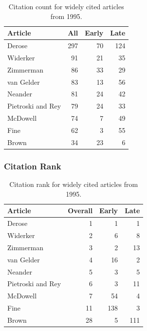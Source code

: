 \documentclass[
  10pt,
  letterpaper,
  DIV=11,
  numbers=noendperiod,
  twoside]{scrartcl}
\begin{document}
\begin{longtable}[]{@{}lrrr@{}}

\caption{\label{tbl-citation-count-1995}Citation count for widely cited
articles from 1995.}

\tabularnewline

\toprule\noalign{}
Article & All & Early & Late \\
\midrule\noalign{}
\endhead
\bottomrule\noalign{}
\endlastfoot
Derose & 297 & 70 & 124 \\
Widerker & 91 & 21 & 35 \\
Zimmerman & 86 & 33 & 29 \\
van Gelder & 83 & 13 & 56 \\
Neander & 81 & 24 & 42 \\
Pietroski and Rey & 79 & 24 & 33 \\
McDowell & 74 & 7 & 49 \\
Fine & 62 & 3 & 55 \\
Brown & 34 & 23 & 6 \\

\end{longtable}

\subsubsection*{Citation Rank}\label{sec-rank-1995}

\begin{longtable}[]{@{}lrrr@{}}

\caption{\label{tbl-citation-rank-1995}Citation rank for widely cited
articles from 1995.}

\tabularnewline

\toprule\noalign{}
Article & Overall & Early & Late \\
\midrule\noalign{}
\endhead
\bottomrule\noalign{}
\endlastfoot
Derose & 1 & 1 & 1 \\
Widerker & 2 & 6 & 8 \\
Zimmerman & 3 & 2 & 13 \\
van Gelder & 4 & 16 & 2 \\
Neander & 5 & 3 & 5 \\
Pietroski and Rey & 6 & 3 & 11 \\
McDowell & 7 & 54 & 4 \\
Fine & 11 & 138 & 3 \\
Brown & 28 & 5 & 111 \\

\end{longtable}
\end{document}
